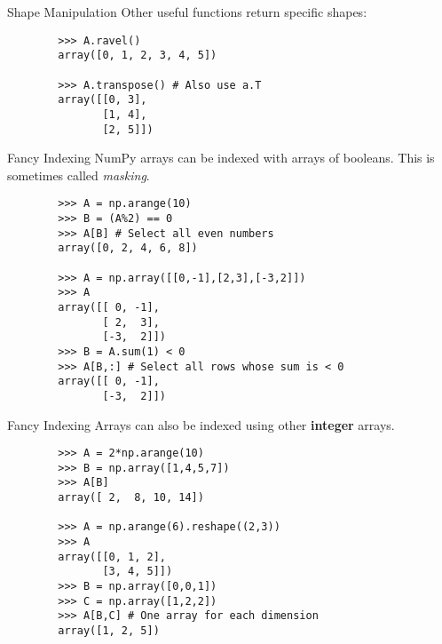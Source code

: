 \documentclass[serif,xcolor=pdftex,dvipsnames,table,hyperref={bookmarks=false,breaklinks}]{beamer}
\begin{document}


\begin{frame}[t,fragile]{Shape Manipulation}
	Other useful functions return specific shapes:
	\pause
	\begin{lstlisting}
		>>> A.ravel()
		array([0, 1, 2, 3, 4, 5])

		>>> A.transpose() # Also use a.T
		array([[0, 3],
		       [1, 4],
		       [2, 5]])
	\end{lstlisting}
\end{frame}

\begin{frame}[t,fragile]{Fancy Indexing}
  	NumPy arrays can be indexed with arrays of booleans. This is sometimes called \emph{masking}.
	
	\pause
	\begin{lstlisting}
		>>> A = np.arange(10)
		>>> B = (A%2) == 0
		>>> A[B] # Select all even numbers
		array([0, 2, 4, 6, 8])
		
		>>> A = np.array([[0,-1],[2,3],[-3,2]])
		>>> A
		array([[ 0, -1],
		       [ 2,  3],
		       [-3,  2]])
		>>> B = A.sum(1) < 0
		>>> A[B,:] # Select all rows whose sum is < 0
		array([[ 0, -1],
		       [-3,  2]])
	\end{lstlisting}
\end{frame}

\begin{frame}[t,fragile]{Fancy Indexing}
  	Arrays can also be indexed using other \textbf{integer} arrays.
	
	\pause
	\begin{lstlisting}
		>>> A = 2*np.arange(10)
		>>> B = np.array([1,4,5,7])
		>>> A[B]
		array([ 2,  8, 10, 14])
		
		>>> A = np.arange(6).reshape((2,3))
		>>> A
		array([[0, 1, 2],
		       [3, 4, 5]])
		>>> B = np.array([0,0,1])
		>>> C = np.array([1,2,2])
		>>> A[B,C] # One array for each dimension
		array([1, 2, 5])
	\end{lstlisting}
\end{frame}
\end{document}
